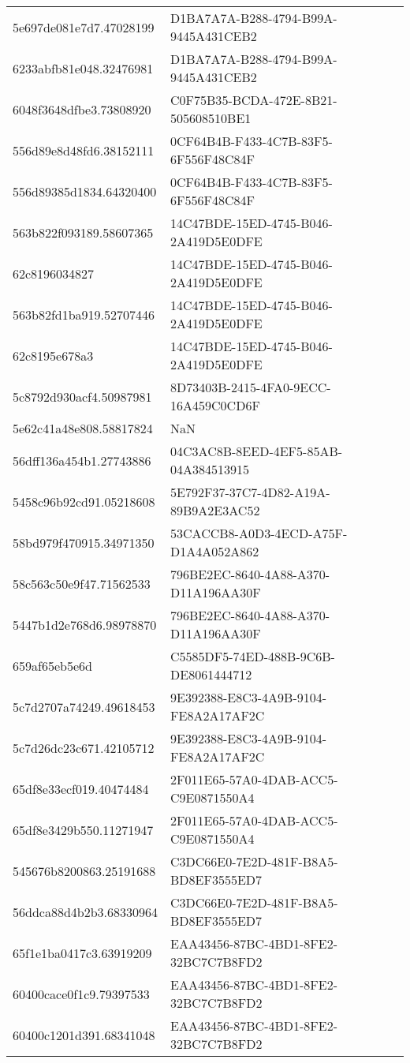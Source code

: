 \begin{tabular}{ll}
5e697de081e7d7.47028199 & D1BA7A7A-B288-4794-B99A-9445A431CEB2 \\
6233abfb81e048.32476981 & D1BA7A7A-B288-4794-B99A-9445A431CEB2 \\
6048f3648dfbe3.73808920 & C0F75B35-BCDA-472E-8B21-505608510BE1 \\
556d89e8d48fd6.38152111 & 0CF64B4B-F433-4C7B-83F5-6F556F48C84F \\
556d89385d1834.64320400 & 0CF64B4B-F433-4C7B-83F5-6F556F48C84F \\
563b822f093189.58607365 & 14C47BDE-15ED-4745-B046-2A419D5E0DFE \\
62c8196034827 & 14C47BDE-15ED-4745-B046-2A419D5E0DFE \\
563b82fd1ba919.52707446 & 14C47BDE-15ED-4745-B046-2A419D5E0DFE \\
62c8195e678a3 & 14C47BDE-15ED-4745-B046-2A419D5E0DFE \\
5c8792d930acf4.50987981 & 8D73403B-2415-4FA0-9ECC-16A459C0CD6F \\
5e62c41a48e808.58817824 & NaN \\
56dff136a454b1.27743886 & 04C3AC8B-8EED-4EF5-85AB-04A384513915 \\
5458c96b92cd91.05218608 & 5E792F37-37C7-4D82-A19A-89B9A2E3AC52 \\
58bd979f470915.34971350 & 53CACCB8-A0D3-4ECD-A75F-D1A4A052A862 \\
58c563c50e9f47.71562533 & 796BE2EC-8640-4A88-A370-D11A196AA30F \\
5447b1d2e768d6.98978870 & 796BE2EC-8640-4A88-A370-D11A196AA30F \\
659af65eb5e6d & C5585DF5-74ED-488B-9C6B-DE8061444712 \\
5c7d2707a74249.49618453 & 9E392388-E8C3-4A9B-9104-FE8A2A17AF2C \\
5c7d26dc23c671.42105712 & 9E392388-E8C3-4A9B-9104-FE8A2A17AF2C \\
65df8e33ecf019.40474484 & 2F011E65-57A0-4DAB-ACC5-C9E0871550A4 \\
65df8e3429b550.11271947 & 2F011E65-57A0-4DAB-ACC5-C9E0871550A4 \\
545676b8200863.25191688 & C3DC66E0-7E2D-481F-B8A5-BD8EF3555ED7 \\
56ddca88d4b2b3.68330964 & C3DC66E0-7E2D-481F-B8A5-BD8EF3555ED7 \\
65f1e1ba0417c3.63919209 & EAA43456-87BC-4BD1-8FE2-32BC7C7B8FD2 \\
60400cace0f1c9.79397533 & EAA43456-87BC-4BD1-8FE2-32BC7C7B8FD2 \\
60400c1201d391.68341048 & EAA43456-87BC-4BD1-8FE2-32BC7C7B8FD2 \\

\end{tabular}
